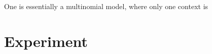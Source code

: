 \documentclass[preprint,12pt]{elsarticle}
\begin{document}
%
%

 One is essentially a multinomial model, where only one context is 

\section{Experiment}\label{sec:exp}
\end{document}
